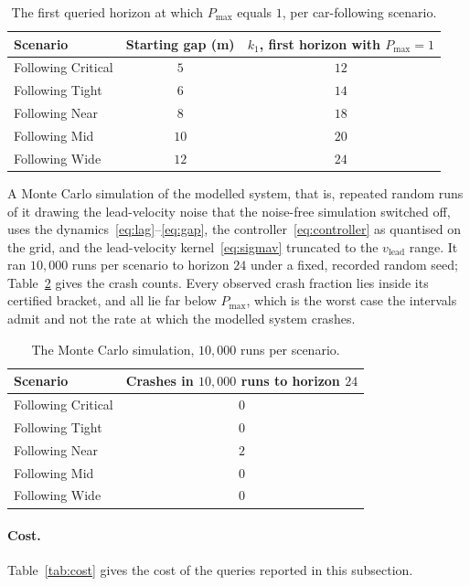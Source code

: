 \documentclass[11pt,a4paper]{article}
\newcommand{\vlead}{v_{\text{lead}}}
\theoremstyle{plain}
\theoremstyle{remark}
\begin{document}
	\begin{table}[H]
		\centering
		\begin{tabular}{lcc}
			\toprule
			Scenario & Starting gap (m) & $k_1$, first horizon with $P_{\max} = 1$ \\
			\midrule
			Following Critical & $5$ & $12$ \\
			Following Tight & $6$ & $14$ \\
			Following Near & $8$ & $18$ \\
			Following Mid & $10$ & $20$ \\
			Following Wide & $12$ & $24$ \\
			\bottomrule
		\end{tabular}
		\caption{The first queried horizon at which $P_{\max}$ equals $1$, per car-following scenario.}
		\label{tab:k1}
	\end{table}
	
	
	A Monte Carlo simulation of the modelled system, that is, repeated random runs of it drawing the lead-velocity noise that the noise-free simulation switched off, uses the dynamics~\eqref{eq:lag}--\eqref{eq:gap}, the controller~\eqref{eq:controller} as quantised on the grid, and the lead-velocity kernel~\eqref{eq:sigmav} truncated to the $\vlead$ range. It ran $10{,}000$ runs per scenario to horizon $24$ under a fixed, recorded random seed; Table~\ref{tab:mc} gives the crash counts. Every observed crash fraction lies inside its certified bracket, and all lie far below $P_{\max}$, which is the worst case the intervals admit and not the rate at which the modelled system crashes.
	
	\begin{table}[H]
		\centering
		\begin{tabular}{lc}
			\toprule
			Scenario & Crashes in $10{,}000$ runs to horizon $24$ \\
			\midrule
			Following Critical & $0$ \\
			Following Tight & $0$ \\
			Following Near & $2$ \\
			Following Mid & $0$ \\
			Following Wide & $0$ \\
			\bottomrule
		\end{tabular}
		\caption{The Monte Carlo simulation, $10{,}000$ runs per scenario.}
		\label{tab:mc}
	\end{table}
	
	\paragraph{Cost.}
	Table~\ref{tab:cost} gives the cost of the queries reported in this subsection.
	
\end{document}
